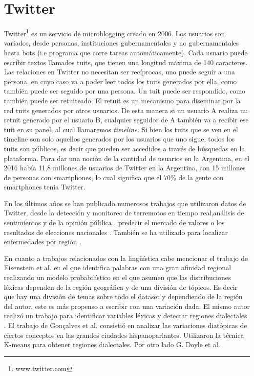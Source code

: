 \section{Twitter}
Twitter\footnote{www.twitter.com} es un servicio de microblogging creado en 2006. Los usuarios son variados, desde personas, instituciones gubernamentales y no gubernamentales hasta bots (i.e programa que corre tareas automáticamente). Cada usuario puede escribir textos llamados tuits, que tienen una longitud máxima de 140 caracteres. Las relaciones en Twitter no necesitan ser recíprocas, uno puede seguir a una persona, en cuyo caso va a poder leer todos los tuits generados por ella, como también puede ser seguido por una persona. Un tuit puede ser respondido, como también puede ser retuiteado. El retuit es un mecanismo para diseminar por la red tuits generados por otros usuarios. De esta manera si un usuario A realiza un retuit generado por el usuario B, cualquier seguidor de A también va a recibir ese tuit en su panel, al cual llamaremos \textit{timeline}. Si bien los tuits que se ven en el timeline son solo aquellos generados por los usuarios que uno sigue, todos los tuits son públicos, es decir que pueden ser accedidos a través de búsquedas en la plataforma.
Para dar una noción de la cantidad de usuarios en la Argentina, en el 2016 había 11,8 millones de usuarios de Twitter en la Argentina, con 15 millones de personas con smartphones, lo cual significa que el $70$\% de la gente con smartphones tenía Twitter.%

En los últimos años se han publicado numerosos trabajos que utilizaron datos de Twitter, desde la detección y monitoreo de terremotos en tiempo real\cite{sakaki2010earthquake},análisis de sentimientos y de la opinión pública \cite{liu2012sentiment},  predecir el mercado de valores \cite{pak2010twitter} o los resultados de elecciones nacionales \cite{tumasjan2010predicting}. También se ha utilizado para localizar enfermedades por región \cite{paul2011you}.

En cuanto a trabajos relacionados con la lingüística cabe mencionar el trabajo de Eisenstein et al. \cite{eisenstein2010latent} en el que identifica palabras con una gran afinidad regional realizando un modelo probabilístico en el que asumen que las distribuciones léxicas dependen de la región geográfica y de una división de tópicos. Es decir que hay una división de temas sobre todo el dataset y dependiendo de la región del autor, este es más propenso a escribir con una variación dada. El mismo autor realizó un trabajo para identificar variables léxicas y detectar regiones dialectales \cite{eisenstein2014identifying}.
El trabajo de Gonçalves et al. \cite{gonccalves2014crowdsourcing} consistió en analizar las variaciones diatópicas de ciertos conceptos en las grandes ciudades hispanoparlantes. Utilizaron la técnica K-means \cite{bishop2006pattern} para obtener regiones dialectales. Por otro lado G. Doyle et al. \cite{doyle2014mapping} 

